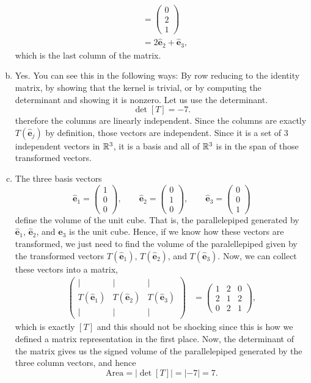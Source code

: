 \documentclass[12pt]{article} %
\newcommand{\ehat}{\boldsymbol{\hat{e}}}
\begin{document}
\begin{solution}
\begin{enumerate}[(a)]
\begin{align*}
&= \begin{pmatrix} 0 \\ 2 \\ 1 \end{pmatrix}\\
&= 2\ehat_2 + \ehat_3,
    \end{align*}
    which is the last column of the matrix.
    \item Yes. You can see this in the following ways: By row reducing to the identity matrix, by showing that the kernel is trivial, or by computing the determinant and showing it is nonzero. Let us use the determinant.
\[
    \det [T] = -7.
\]
therefore the columns are linearly independent. Since the columns are exactly $T(\ehat_j)$ by definition, those vectors are independent. Since it is a set of 3 independent vectors in $\mathbb{R}^3$, it is a basis and all of $\mathbb{R}^3$ is in the span of those transformed vectors.
    \item The three basis vectors
    \[
    \ehat_1 = \begin{pmatrix} 1 \\ 0 \\ 0 \end{pmatrix}, \qquad \ehat_2 = \begin{pmatrix} 0 \\ 1 \\ 0 \end{pmatrix}, \qquad \ehat_3 =\begin{pmatrix} 0 \\ 0 \\ 1 \end{pmatrix}
    \]
    define the volume of the unit cube. That is, the parallelepiped generated by $\ehat_1$, $\ehat_2$, and $\ehat_3$ is the unit cube. Hence, if we know how these vectors are transformed, we just need to find the volume of the paralellepiped given by the transformed vectors $T(\ehat_1)$, $T(\ehat_2)$, and $T(\ehat_3)$.  Now, we can collect these vectors into a matrix,
    \begin{align*}
    \begin{pmatrix} \vert & \vert & \vert \\ T(\ehat_1) & T(\ehat_2) & T(\ehat_3) \\ \vert & \vert & \vert \end{pmatrix} &= \begin{pmatrix}  1& 2& 0\\
2& 1& 2\\
0& 2& 1\end{pmatrix},
    \end{align*}
    which is exactly $[T]$ and this should not be shocking since this is how we defined a matrix representation in the first place. Now, the determinant of the matrix gives us the signed volume of the parallelepiped generated by the three column vectors, and hence
    \[
    \mathrm{Area}=|\det[T]|=|-7|=7.
    \]
\end{enumerate}
\end{solution}
\end{document}
